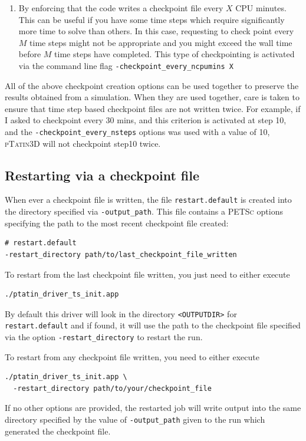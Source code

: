 \documentclass[paper=a4, fontsize=11pt,twoside]{scrartcl}
\newcommand{\ptat}{{{\textsc{pTatin3D}}}}
\newcommand{\PETSc}{{{\textsc{PETSc}}}}
\begin{document}
{{\begin{enumerate}
\item By enforcing that the code writes a checkpoint file every $X$ CPU minutes. 
This can be useful if you have some time steps which require significantly more time to solve than others.
In this case, requesting to check point every $M$ time steps might not be appropriate and you might exceed the wall time before $M$ time steps have completed.
This type of checkpointing is activated via the command line flag\newline
{\tt -checkpoint\_every\_ncpumins X}
\end{enumerate}

All of the above checkpoint creation options can be used together to preserve the results obtained from a simulation.
When they are used together, care is taken to ensure that time step based checkpoint files are not written twice.
For example, if I asked to checkpoint every 30 mins, and this criterion is activated at step 10, and the {\tt -checkpoint\_every\_nsteps} options was used with a value of 10, {\ptat} will not checkpoint step10 twice.

\subsection{Restarting via a checkpoint file}

When ever a checkpoint file is written, the file {\tt restart.default} is created into the directory specified via {\tt -output\_path}.
This file contains a {\PETSc} options specifying the path to the most recent checkpoint file created:
\begin{lstlisting}
# restart.default
-restart_directory path/to/last_checkpoint_file_written
\end{lstlisting}

To restart from the last checkpoint file written, you just need to either execute
\begin{lstlisting}
./ptatin_driver_ts_init.app
\end{lstlisting}
By default this driver will look in the directory {\tt <OUTPUTDIR>} for {\tt restart.default} and if found, it will use the path to the checkpoint file specified via the option {\tt -restart\_directory} to restart the run.

To restart from any checkpoint file written, you need to either execute
\begin{lstlisting}
./ptatin_driver_ts_init.app \
  -restart_directory path/to/your/checkpoint_file
\end{lstlisting}
If no other options are provided, the restarted job will write output into the same directory specified by the value of {\tt -output\_path} given to the run which generated the checkpoint file.

}}
\end{document}
